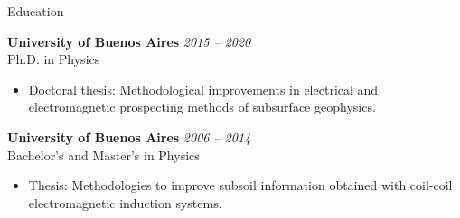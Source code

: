 \documentclass{resume}
\begin{document}
\begin{rSection}{Education}

{\bf University of Buenos Aires} \hfill {\em 2015 -- 2020}\\
Ph.D. in Physics
\begin{itemize}
  \item Doctoral thesis: Methodological improvements in electrical and electromagnetic prospecting methods of subsurface geophysics.
\end{itemize}

{\bf University of Buenos Aires} \hfill {\em 2006 -- 2014}\\
Bachelor's and Master's in Physics
\begin{itemize}
  \item Thesis: Methodologies to improve subsoil information obtained with coil-coil electromagnetic induction systems.
\end{itemize}

\end{rSection}
\end{document}
